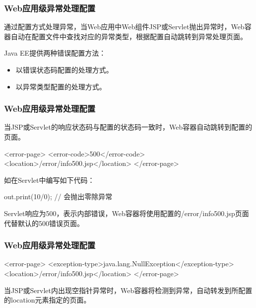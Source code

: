 \begin{frame}[fragile] %
\frametitle{Web应用级异常处理配置} 

通过配置方式处理异常，当Web应用中Web组件JSP或Servlet抛出异常时，Web容器自动在配置文件中查找对应的异常类型，根据配置自动跳转到异常处理页面。

Java EE提供两种错误配置方法：
\begin{itemize}\kai
\item 以错误状态码配置的处理方式。
\item 以异常类型配置的处理方式。
\end{itemize}
\end{frame}

\begin{frame}[fragile] %
\frametitle{Web应用级异常处理配置} 


当JSP或Servlet的响应状态码与配置的状态码一致时，Web容器自动跳转到配置的页面。

\begin{xmlCode}
<error-page>  
  <error-code>500</error-code>
  <location>/error/info500.jsp</location>
</error-page>  
\end{xmlCode}

如在Servlet中编写如下代码：

\begin{javaCode}
out.print(10/0); // 会抛出零除异常
\end{javaCode}

Servlet响应为500，表示内部错误，Web容器将使用配置的/error/info500.jsp页面代替默认的500错误页面。
\end{frame}

\begin{frame}[fragile] %
\frametitle{Web应用级异常处理配置} 


\begin{xmlCode}
<error-page>  
  <exception-type>java.lang.NullException</exception-type>
  <location>/error/info500.jsp</location>
</error-page>  
\end{xmlCode}

当JSP或Servlet内出现空指针异常时，Web容器将检测到异常，自动转发到所配置的location元素指定的页面。

\end{frame}


